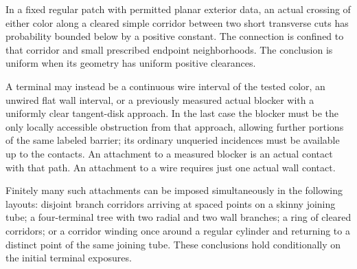 \begin{proposition}
\label{prop:routing}
In a fixed regular patch with permitted planar exterior data, an actual
crossing of either color along a cleared simple corridor between two
short transverse cuts has probability bounded below by a positive
constant. The connection is confined to that corridor and small
prescribed endpoint neighborhoods. The conclusion is uniform when its
geometry has uniform positive clearances.

A terminal may instead be a continuous wire interval of the tested
color, an unwired flat wall interval, or a previously measured actual
blocker with a uniformly clear tangent-disk approach. In the last case
the blocker must be the only locally accessible obstruction from that
approach, allowing further portions of the same labeled barrier; its
ordinary unqueried incidences must be available up to the contacts.
An attachment to a measured blocker is an actual contact with that
path. An attachment to a wire requires just one actual wall contact.

Finitely many such attachments can be imposed simultaneously in the
following layouts: disjoint branch corridors arriving at spaced points
on a skinny joining tube; a four-terminal tree with two radial and two
wall branches; a ring of cleared corridors; or a corridor winding once
around a regular cylinder and returning to a distinct point of the
same joining tube. These conclusions hold conditionally on the
initial terminal exposures.
\end{proposition}

